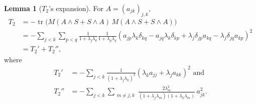\documentclass[11pt]{amsart}
\numberwithin{equation}{section}
\theoremstyle{definition}
\theoremstyle{definition}
\newtheorem{lemma}[equation]{Lemma}
\newcommand{\pr}[1]{\left(#1\right)}
\begin{document}
\begin{lemma}[$T_2$'s expansion]
	\label{lem:T2}
	For $A=(a_{jk})_{j,k},$
	\begin{align*}T_2
	&= - \operatorname{tr}\big(M (A \wedge S + S \wedge A)\, M (A \wedge S + S \wedge A)\big)\\
	&=- \sum_{j<k}\sum_{p<q}
	\frac 1{1+\lambda_j\lambda_k}
	\frac 1{1+\lambda_p\lambda_q}
	\pr{a_{jp}\lambda_k\delta_{kq} - a_{jq}\lambda_k\delta_{kp}
		+ \lambda_j\delta_{jp}a_{kq}
		- \lambda_j\delta_{jq}a_{kp}}^2\\
	&=T_2'+T_2'',
	\end{align*}
	where 
	\begin{align*}T_2'&=- \sum_{j<k}
	\frac 1{(1+\lambda_j\lambda_k)^2} 
	\pr{\lambda_k a_{jj}
		+ \lambda_j a_{kk}
	}^2\text{ and}\\
	T_2''
	&=-\sum_{j<k}\sum_{\substack{m\neq j,k}}
	\frac{2\lambda_m^2}
	{(1+\lambda_j\lambda_m)(1+\lambda_k\lambda_m)}
	\, a_{jk}^2.
	\end{align*}
\end{lemma}
\end{document}
